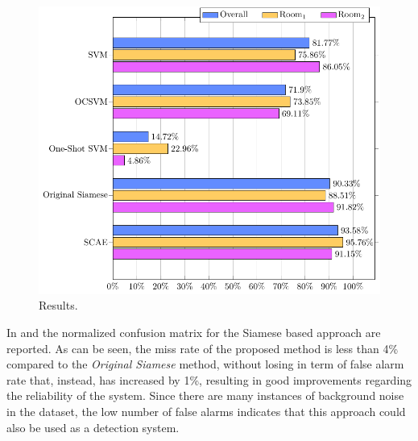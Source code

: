 \begin{figure}[h!]
	\centering
	\includegraphics[width=\textwidth]{img/eeai/results_f1/results_f1}
	\caption[]
	{Results.} 
	\label{fig:results}
\end{figure}
In  and  the normalized confusion matrix for the Siamese based approach are reported. As can be seen, the miss rate of the proposed method is less than 4\% compared to the \textit{Original Siamese} method, without losing in term of false alarm rate that, instead, has increased by 1\%, resulting in good improvements regarding the reliability of the system. Since there are many instances of background noise in the dataset, the low number of false alarms indicates that this approach could also be used as a detection system.

